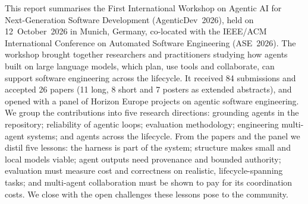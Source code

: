 This report summarises the First International Workshop on Agentic AI for Next-Generation Software Development (AgenticDev~2026), held on 12~October~2026 in Munich, Germany, co-located with the IEEE/ACM International Conference on Automated Software Engineering (ASE~2026). The workshop brought together researchers and practitioners studying how agents built on large language models, which plan, use tools and collaborate, can support software engineering across the lifecycle. It received 84 submissions and accepted 26 papers (11 long, 8 short and 7 posters as extended abstracts), and opened with a panel of Horizon Europe projects on agentic software engineering. We group the contributions into five research directions: grounding agents in the repository; reliability of agentic loops; evaluation methodology; engineering multi-agent systems; and agents across the lifecycle. From the papers and the panel we distil five lessons: the harness is part of the system; structure makes small and local models viable; agent outputs need provenance and bounded authority; evaluation must measure cost and correctness on realistic, lifecycle-spanning tasks; and multi-agent collaboration must be shown to pay for its coordination costs. We close with the open challenges these lessons pose to the community.
